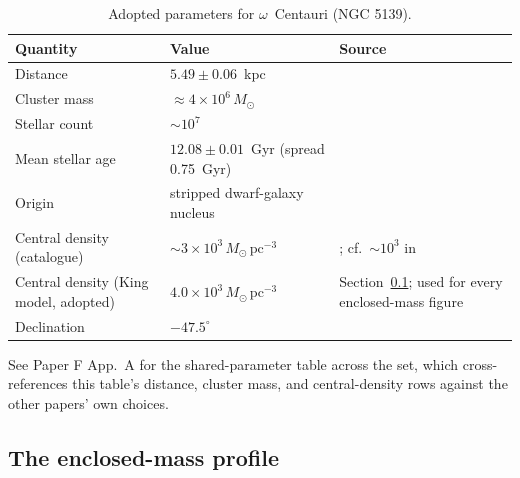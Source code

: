 \documentclass[11pt]{article}
\newcommand{\msun}{\ensuremath{M_\odot}}
\begin{document}
\begin{table}[tbp]
\centering
\caption{Adopted parameters for $\omega$~Centauri (NGC 5139).}
\label{tab:ocparams}
\small
\begin{tabular}{p{3.2cm} p{5.2cm} p{4.6cm}}
\toprule
Quantity & Value & Source \\
\midrule
Distance & $5.49 \pm 0.06$~kpc & \citet{Haberle2025oMEGACatVI} \\
Cluster mass & $\approx 4\times10^{6}\,\msun$ & \citet{Harris1996,BaumgardtVasiliev2021} \\
Stellar count & $\sim 10^{7}$ & \citet{Harris1996} \\
Mean stellar age & $12.08 \pm 0.01$~Gyr (spread 0.75~Gyr) & \citet{Clontz2024} \\
Origin & stripped dwarf-galaxy nucleus & \citet{HilkerRichtler2000,Ibata2019,Souza2026oMEGACatX} \\
Central density (catalogue) & $\sim 3\times10^{3}\,\msun\,\mathrm{pc}^{-3}$ & \citet{BaumgardtVasiliev2021}; cf.\ $\sim 10^{3}$ in \citet{PryorMeylan1993} \\
Central density (King model, adopted) & $4.0\times10^{3}\,\msun\,\mathrm{pc}^{-3}$ & Section~\ref{sec:encmass}; used for every enclosed-mass figure \\
Declination & $-47.5^{\circ}$ & \citet{Harris1996} \\
\bottomrule
\end{tabular}
\end{table}

See Paper F App.~A for the shared-parameter table across the set, which cross-references this table's distance, cluster mass, and central-density rows against the other papers' own choices.

\subsection{The enclosed-mass profile}
\label{sec:encmass}
\end{document}

